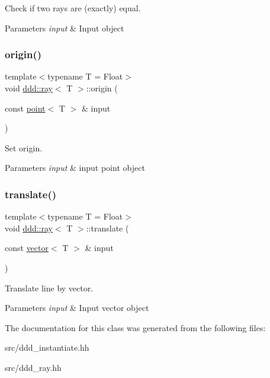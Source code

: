 Check if two rays are (exactly) equal. 


\begin{DoxyParams}{Parameters}
{\em input} & Input object \\
\hline
\end{DoxyParams}
\mbox{\label{classddd_1_1ray_ac7a05d23b571b8e60ab9b25e53a8962f}} 
\subsubsection{\texorpdfstring{origin()}{origin()}}
{\footnotesize\ttfamily template$<$typename T = Float$>$ \\
void \hyperlink{classddd_1_1ray}{ddd\+::ray}$<$ T $>$\+::origin (\begin{DoxyParamCaption}\item[{const \hyperlink{classddd_1_1point}{point}$<$ T $>$ \&}]{input }\end{DoxyParamCaption})\hspace{0.3cm}{\ttfamily [inline]}}



Set origin. 


\begin{DoxyParams}{Parameters}
{\em input} & input point object \\
\hline
\end{DoxyParams}
\mbox{\label{classddd_1_1ray_a705a8f1ab49b183b03a42e097bd40649}} 
\subsubsection{\texorpdfstring{translate()}{translate()}}
{\footnotesize\ttfamily template$<$typename T = Float$>$ \\
void \hyperlink{classddd_1_1ray}{ddd\+::ray}$<$ T $>$\+::translate (\begin{DoxyParamCaption}\item[{const \hyperlink{classddd_1_1vector}{vector}$<$ T $>$ \&}]{input }\end{DoxyParamCaption})\hspace{0.3cm}{\ttfamily [inline]}}



Translate line by vector. 


\begin{DoxyParams}{Parameters}
{\em input} & Input vector object \\
\hline
\end{DoxyParams}


The documentation for this class was generated from the following files\+:\begin{DoxyCompactItemize}
\item 
src/ddd\+\_\+instantiate.\+hh\item 
src/ddd\+\_\+ray.\+hh\end{DoxyCompactItemize}
